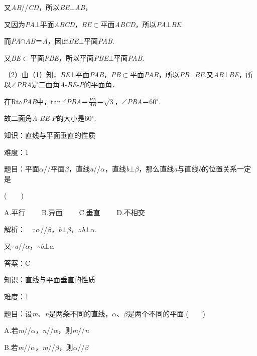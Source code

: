 \documentclass{article} %
\begin{document}
又\textit{AB}//\textit{CD}，所以\textit{BE}$\mathrm{\bot}$\textit{AB}，

又因为\textit{PA}$\mathrm{\bot}$平面\textit{ABCD}，\textit{BE}$\mathrm{\subset }$平面\textit{ABCD}，所以\textit{PA}$\mathrm{\bot}$\textit{BE}.

而\textit{PA}$\mathrm{\cap}$\textit{AB}＝\textit{A}，因此\textit{BE}$\mathrm{\bot}$平面\textit{PAB}.

又\textit{BE}$\mathrm{\subset }$平面\textit{PBE}，所以平面\textit{PBE}$\mathrm{\bot}$平面\textit{PAB}.

（2）由（1）知，\textit{BE}$\mathrm{\bot}$平面\textit{PAB}，\textit{PB}$\mathrm{\subset }$平面\textit{PAB}，所以\textit{PB}$\mathrm{\bot}$\textit{BE}.又\textit{AB}$\mathrm{\bot}$\textit{BE}，所以$\mathrm{\angle}$\textit{PBA}是二面角\textit{A}-\textit{BE}-\textit{P}的平面角．

在Rt$\mathrm{\vartriangle}$\textit{PAB}中，tan$\mathrm{\angle}$\textit{PBA}＝$\frac{PA}{AB}$＝$\sqrt{3}$，$\mathrm{\angle}$\textit{PBA}＝60$\mathrm{{}^\circ}$.

故二面角\textit{A}-\textit{BE}-\textit{P}的大小是60$\mathrm{{}^\circ}$.

知识：直线与平面垂直的性质

难度：1

题目：平面\textit{$\alpha$}//平面\textit{$\beta$}，直线\textit{a}//\textit{$\alpha$}，直线\textit{b}$\mathrm{\bot}$\textit{$\beta$}，那么直线\textit{a}与直线\textit{b}的位置关系一定是

(　　)

A.平行　　 B.异面　　 C.垂直　　 D.不相交

解析：　$\mathrm{\because}$\textit{$\alpha$}//\textit{$\beta$}，\textit{b}$\mathrm{\bot}$\textit{$\beta$}，$\mathrm{\therefore}$\textit{b}$\mathrm{\bot}$\textit{$\alpha$}.

又$\mathrm{\because}$\textit{a}//\textit{$\alpha$}，$\mathrm{\therefore}$\textit{b}$\mathrm{\bot}$\textit{a}.

答案：C

知识：直线与平面垂直的性质

难度：1

题目：设\textit{m}、\textit{n}是两条不同的直线，\textit{$\alpha$}、\textit{$\beta$}是两个不同的平面.(　　)

A.若\textit{m}//\textit{$\alpha$}，\textit{n}//\textit{$\alpha$}，则\textit{m}//\textit{n}

B.若\textit{m}//\textit{$\alpha$}，\textit{m}//\textit{$\beta$}，则\textit{$\alpha$}//\textit{$\beta$}
\end{document}
